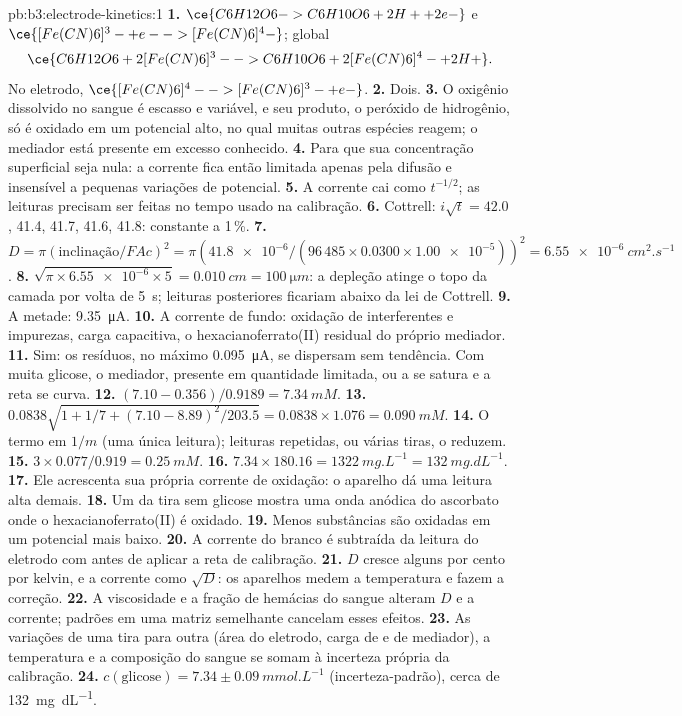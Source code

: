 \begin{solution}{pb:b3:electrode-kinetics:1}
\textbf{1.} $\ce{C6H12O6 -> C6H10O6 + 2 H+ + 2 e-}$ e $\ce{[Fe(CN)6]^3- + e- -> [Fe(CN)6]^4-}$;
global
\[
  \ce{C6H12O6 + 2 [Fe(CN)6]^3- -> C6H10O6 + 2 [Fe(CN)6]^4- + 2 H+} .
\]
No eletrodo, $\ce{[Fe(CN)6]^4- -> [Fe(CN)6]^3- + e-}$.
\textbf{2.} Dois.
\textbf{3.} O oxigênio dissolvido no sangue é escasso e variável, e seu produto, o
peróxido de hidrogênio, só é oxidado em um potencial alto, no qual muitas outras
espécies reagem; o mediador está presente em excesso conhecido.
\textbf{4.} Para que sua concentração superficial seja nula: a corrente fica então
limitada apenas pela difusão e insensível a pequenas variações de potencial.
\textbf{5.} A corrente cai como $t^{-1/2}$; as leituras precisam ser feitas no tempo usado
na calibração.
\textbf{6.} Cottrell: $i\sqrt t = 42.0$, 41.4, 41.7, 41.6, 41.8: constante a 1\,\%.
\textbf{7.} $D = \pi(\text{inclinação}/FAc)^2 = \pi(\num{41.8e-6}/(96\,485 \times 0.0300 \times \num{1.00e-5}))^2 = \qty{6.55e-6}{cm^2.s^{-1}}$.
\textbf{8.} $\sqrt{\pi \times \num{6.55e-6} \times 5} = \qty{0.010}{cm} = \qty{100}{\micro m}$: a depleção atinge o topo da
camada por volta de \qty{5}{s}; leituras posteriores ficariam abaixo da lei de Cottrell.
\textbf{9.} A metade: \qty{9.35}{\micro A}.
\textbf{10.} A corrente de fundo: oxidação de interferentes e impurezas, carga
capacitiva, o hexacianoferrato(II) residual do próprio mediador.
\textbf{11.} Sim: os resíduos, no máximo \qty{0.095}{\micro A}, se dispersam sem tendência. Com muita glicose, o mediador, presente em
quantidade limitada, ou a  se satura e a reta se curva.
\textbf{12.} $(7.10 - 0.356)/0.9189 = \qty{7.34}{mM}$.
\textbf{13.} $0.0838\sqrt{1 + 1/7 + (7.10 - 8.89)^2/203.5} = 0.0838 \times 1.076 = \qty{0.090}{mM}$.
\textbf{14.} O termo em $1/m$ (uma única leitura); leituras repetidas, ou várias tiras,
o reduzem.
\textbf{15.} $3 \times 0.077/0.919 = \qty{0.25}{mM}$.
\textbf{16.} $7.34 \times 180.16 = \qty{1322}{mg.L^{-1}} = \qty{132}{mg.dL^{-1}}$.
\textbf{17.} Ele acrescenta sua própria corrente de oxidação: o aparelho dá uma leitura alta demais.
\textbf{18.} Um  da tira sem glicose mostra uma onda anódica do ascorbato
onde o hexacianoferrato(II) é oxidado.
\textbf{19.} Menos substâncias são oxidadas em um potencial mais baixo.
\textbf{20.} A corrente do branco é subtraída da leitura do eletrodo com  antes
de aplicar a reta de calibração.
\textbf{21.} $D$ cresce alguns por cento por kelvin, e a corrente como $\sqrt D$: os aparelhos
medem a temperatura e fazem a correção.
\textbf{22.} A viscosidade e a fração de hemácias do sangue alteram $D$ e a corrente;
padrões em uma matriz semelhante cancelam esses efeitos.
\textbf{23.} As variações de uma tira para outra (área do eletrodo, carga de  e
de mediador), a temperatura e a composição do sangue se somam à incerteza própria da calibração.
\textbf{24.} \textbf{$c(\text{glicose}) = 7.34 \pm \qty{0.09}{mmol.L^{-1}}$} (incerteza-padrão), cerca de \qty{132}{mg.dL^{-1}}.
\end{solution}
